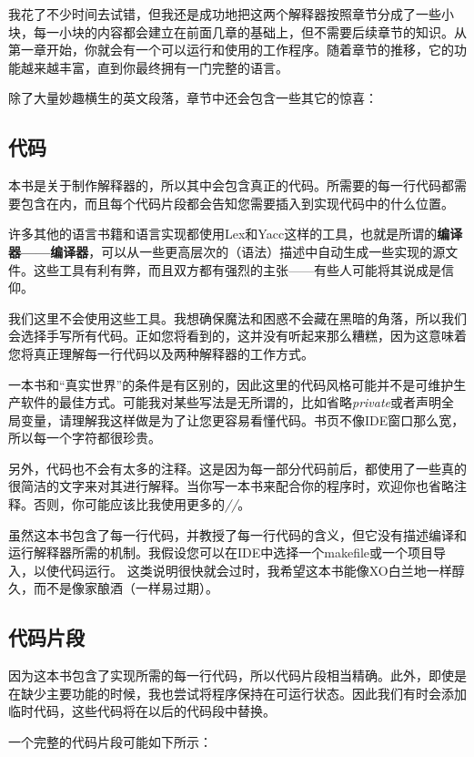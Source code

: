\documentclass[cn,11pt,chinese]{elegantbook}
\begin{document}
我花了不少时间去试错，但我还是成功地把这两个解释器按照章节分成了一些小块，每一小块的内容都会建立在前面几章的基础上，但不需要后续章节的知识。从第一章开始，你就会有一个可以运行和使用的工作程序。随着章节的推移，它的功能越来越丰富，直到你最终拥有一门完整的语言。

除了大量妙趣横生的英文段落，章节中还会包含一些其它的惊喜：

\subsection{代码}

本书是关于制作解释器的，所以其中会包含真正的代码。所需要的每一行代码都需要包含在内，而且每个代码片段都会告知您需要插入到实现代码中的什么位置。

许多其他的语言书籍和语言实现都使用Lex和Yacc这样的工具，也就是所谓的\textbf{编译器——编译器}，可以从一些更高层次的（语法）描述中自动生成一些实现的源文件。这些工具有利有弊，而且双方都有强烈的主张——有些人可能将其说成是信仰。

我们这里不会使用这些工具。我想确保魔法和困惑不会藏在黑暗的角落，所以我们会选择手写所有代码。正如您将看到的，这并没有听起来那么糟糕，因为这意味着您将真正理解每一行代码以及两种解释器的工作方式。

一本书和“真实世界”的条件是有区别的，因此这里的代码风格可能并不是可维护生产软件的最佳方式。可能我对某些写法是无所谓的，比如省略\textit{private}或者声明全局变量，请理解我这样做是为了让您更容易看懂代码。书页不像IDE窗口那么宽，所以每一个字符都很珍贵。

另外，代码也不会有太多的注释。这是因为每一部分代码前后，都使用了一些真的很简洁的文字来对其进行解释。当你写一本书来配合你的程序时，欢迎你也省略注释。否则，你可能应该比我使用更多的\textit{//}。

虽然这本书包含了每一行代码，并教授了每一行代码的含义，但它没有描述编译和运行解释器所需的机制。我假设您可以在IDE中选择一个makefile或一个项目导入，以使代码运行。 这类说明很快就会过时，我希望这本书能像XO白兰地一样醇久，而不是像家酿酒（一样易过期）。

\subsection{代码片段}

因为这本书包含了实现所需的每一行代码，所以代码片段相当精确。此外，即使是在缺少主要功能的时候，我也尝试将程序保持在可运行状态。因此我们有时会添加临时代码，这些代码将在以后的代码段中替换。

一个完整的代码片段可能如下所示：
\end{document}

